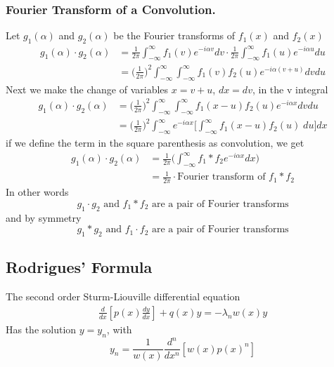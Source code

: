 \documentclass[../main.tex]{subfiles}
\begin{document}
\subsubsection*{Fourier Transform of a Convolution.} Let $g_1(\alpha)$ and $g_2(\alpha)$ be the Fourier transforms of $f_1(x)$ and $f_2(x)$
\begin{align*}
    g_1(\alpha)\cdot g_2(\alpha) & =\frac{1}{2\pi}\int_{-\infty}^{\infty}f_1(v)e^{-i\alpha v}dv\cdot \frac{1}{2\pi}\int_{-\infty}^{\infty}f_1(u)e^{-i\alpha u}du \\
                                 & =\biggl(\frac{1}{2\pi}\biggr)^2\int_{-\infty}^{\infty}\int_{-\infty}^{\infty} f_1(v)f_2(u)e^{-i\alpha (v+u)}dvdu
\end{align*}
Next we make the change of variables $x = v + u$, $dx = dv$, in the v integral
\begin{align*}
    g_1(\alpha)\cdot g_2(\alpha) & = \biggl(\frac{1}{2\pi}\biggr)^2\int_{-\infty}^{\infty}\int_{-\infty}^{\infty} f_1(x-u)f_2(u)e^{-i\alpha x}dvdu                \\
                                 & = \biggl(\frac{1}{2\pi}\biggr)^2\int_{-\infty}^{\infty}e^{-i\alpha x}\biggl[\int_{-\infty}^{\infty}f_1(x-u)f_2(u)\;du\biggr]dx
\end{align*}
if we define the term in the square parenthesis as convolution, we get
\begin{align*}
    g_1(\alpha)\cdot g_2(\alpha) & =\frac{1}{2\pi}\biggl(\int_{-\infty}^{\infty}f_1*f_2e^{-i\alpha x}dx\biggr) \\
                                 & =\frac{1}{2\pi}\cdot\text{Fourier transform of }f_1*f_2
\end{align*}
In other words
\begin{equation*}
    g_1\cdot g_2\text{ and }f_1*f_2\text{ are a pair of Fourier transforms}
\end{equation*}
and by symmetry
\begin{equation*}
    g_1* g_2\text{ and }f_1\cdot f_2\text{ are a pair of Fourier transforms}
\end{equation*}

\subsection*{Rodrigues' Formula}
The second order Sturm-Liouville differential equation
\begin{align*}
    \frac{d}{dx} \left[p(x) \frac{dy}{dx}\right] + q(x)y = -\lambda_n w(x) y
\end{align*}
Has the solution $y=y_n$, with
\begin{equation*}
    y_n=\frac{1}{w(x)}\frac{d^n}{dx^n}[w(x)p(x)^n]
\end{equation*}
\end{document}
